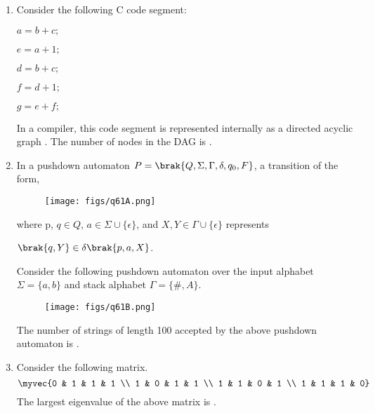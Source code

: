 \documentclass[a4paper, 11pt]{article}
\begin{document}
\begin{enumerate}
    \hfill{}
    
    \item Consider the following C code segment:
    
    $a = b + c;$
    
    $e = a + 1;$
    
    $d = b + c;$
    
    $f = d + 1;$
    
    $g = e + f;$
    
    In a compiler, this code segment is represented internally as a directed acyclic graph . The number of nodes in the DAG is \underline{\hspace{2cm}}.
    
    \hfill{}
    
    \item In a pushdown automaton $P=\brak{Q, \Sigma, \Gamma, \delta, q_0, F}$, a transition of the form,\\ 
    \begin{figure}[H]
        \centering
        \texttt{[image: figs/q61A.png]}
        \label{fig:placeholder}
    \end{figure}
    where p, $q \in Q$, $a \in \Sigma \cup \{\epsilon\}$, and $X, Y \in \Gamma \cup \{\epsilon\}$ represents \\
    \begin{center}
        $\brak{q,Y} \in \delta\brak{p,a,X}$.
    \end{center}
    Consider the following pushdown automaton over the input alphabet $\Sigma = \{a,b\}$ and stack alphabet $\Gamma = \{\#,A\}$.
    \begin{figure}[H]
        \centering
        \texttt{[image: figs/q61B.png]}
        \label{fig:placeholder}
    \end{figure}
    The number of strings of length 100 accepted by the above pushdown automaton is \underline{\hspace{2cm}}.
    
    \hfill{}
    
    \item Consider the following matrix.
    \[ \myvec{0 & 1 & 1 & 1 \\ 1 & 0 & 1 & 1 \\ 1 & 1 & 0 & 1 \\ 1 & 1 & 1 & 0} \]
    The largest eigenvalue of the above matrix is \underline{\hspace{2cm}}.
    

\end{enumerate}
\end{document}
